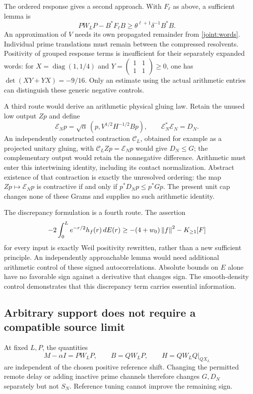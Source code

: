 The ordered response gives a second approach. With $F_\ell$ as
above, a sufficient lemma is
\[
PW_LP-B^*F_\ell B\ge\theta^{\ell+1}\delta^{-1}B^*B.
\]
An approximation of $V$ needs its own propagated remainder from
\eqref{joint:words}. Individual prime translations must remain
between the compressed resolvents. Positivity of grouped response
terms is insufficient for their separately expanded words: for
$X=\operatorname{diag}(1,1/4)$ and
$Y=\left(\begin{smallmatrix}1&1\\1&1\end{smallmatrix}\right)\ge0$,
one has $\det(XY+YX)=-9/16$.
Only an estimate using the actual arithmetic entries can distinguish
these generic negative controls.

A third route would derive an arithmetic physical gluing law.
Retain the unused low output $Zp$ and define
\[
\mathcal E_Np=\sqrt\alpha\,(p,V^{1/2}H^{-1/2}Bp),
\qquad \mathcal E_N^*\mathcal E_N=D_N.
\]
An independently constructed contraction $\mathcal C_L$, obtained
for example as a projected unitary gluing, with
$\mathcal C_LZp=\mathcal E_Np$ would give $D_N\le G$; the
complementary output would retain the nonnegative difference.
Arithmetic must enter this intertwining identity, including its
contact normalization. Abstract existence of that contraction is
exactly the unresolved ordering: the map $Zp\mapsto\mathcal E_Np$
is contractive if and only if $p^*D_Np\le p^*Gp$.
The present unit cap changes none of these Grams and supplies no
such arithmetic identity.

The discrepancy formulation is a fourth route. The assertion
\[
-2\int_0^L e^{-r/2}h_f(r)\,dE(r)
\ge-(4+w_0)\left\lVert f\right\rVert^2-K_{\ge1}[F]
\]
for every input is exactly Weil positivity rewritten, rather than
 a new sufficient principle. An independently approachable lemma
would need additional arithmetic control of these signed
 autocorrelations. Absolute bounds on $E$ alone have no favorable
sign against a derivative that changes sign. The smooth-density
control demonstrates that this discrepancy term carries essential
information.

\subsection{Arbitrary support does not require a compatible source limit}
At fixed $L,P$, the quantities
\[
M-\alpha I=PW_LP,\qquad B=QW_LP,\qquad H=QW_LQ|_{QX_L}
\]
are independent of the chosen positive reference shift.
Changing the permitted remote delay or adding inactive prime
channels therefore changes $G,D_N$ separately but not $S_N$.
Reference tuning cannot improve the remaining sign.

